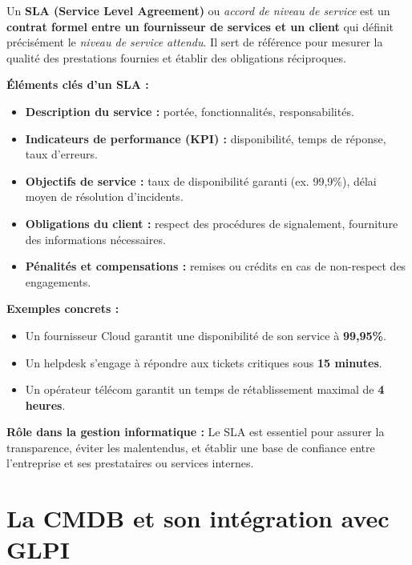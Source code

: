 \documentclass[a4paper,11pt]{article}
\begin{document}
\begin{tcolorbox}[colback=blue!5,colframe=blue!70!black,title=Qu'est-ce qu'un SLA (Service Level Agreement) ?]

Un \textbf{SLA (Service Level Agreement)} ou \textit{accord de niveau de service} est un 
\textbf{contrat formel entre un fournisseur de services et un client} qui définit précisément 
le \textit{niveau de service attendu}.  
Il sert de référence pour mesurer la qualité des prestations fournies et établir des obligations réciproques.  

\medskip
\textbf{Éléments clés d’un SLA :}
\begin{itemize}
  \item \textbf{Description du service :} portée, fonctionnalités, responsabilités.
  \item \textbf{Indicateurs de performance (KPI) :} disponibilité, temps de réponse, taux d’erreurs.
  \item \textbf{Objectifs de service :} taux de disponibilité garanti (ex. 99,9\%), délai moyen de résolution d’incidents.
  \item \textbf{Obligations du client :} respect des procédures de signalement, fourniture des informations nécessaires.
  \item \textbf{Pénalités et compensations :} remises ou crédits en cas de non-respect des engagements.
\end{itemize}

\medskip
\textbf{Exemples concrets :}
\begin{itemize}
  \item Un fournisseur Cloud garantit une disponibilité de son service à \textbf{99,95\%}.
  \item Un helpdesk s’engage à répondre aux tickets critiques sous \textbf{15 minutes}.
  \item Un opérateur télécom garantit un temps de rétablissement maximal de \textbf{4 heures}.
\end{itemize}

\medskip
\textbf{Rôle dans la gestion informatique :}  
Le SLA est essentiel pour assurer la transparence, éviter les malentendus, et établir une base de confiance entre 
l’entreprise et ses prestataires ou services internes.
\end{tcolorbox}



\section*{La CMDB et son intégration avec GLPI}
\end{document}
